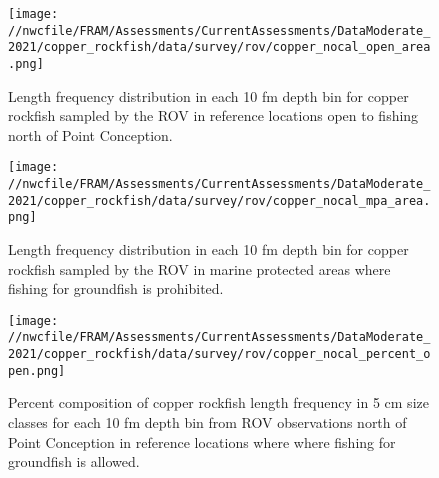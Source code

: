 \documentclass[11pt,
  english,
  a4paper,
]{article}
\begin{document}

\begin{figure}
\centering
\texttt{[image: //nwcfile/FRAM/Assessments/CurrentAssessments/DataModerate\_2021/copper\_rockfish/data/survey/rov/copper\_nocal\_open\_area.png]}
\caption{Length frequency distribution in each 10 fm depth bin for copper rockfish sampled by the ROV in reference locations open to fishing north of Point Conception.\label{fig:rov-open}}
\end{figure}

\tagmcend\tagstructend

\clearpage


\begin{figure}
\centering
\texttt{[image: //nwcfile/FRAM/Assessments/CurrentAssessments/DataModerate\_2021/copper\_rockfish/data/survey/rov/copper\_nocal\_mpa\_area.png]}
\caption{Length frequency distribution in each 10 fm depth bin for copper rockfish sampled by the ROV in marine protected areas where fishing for groundfish is prohibited.\label{fig:rov-mpa}}
\end{figure}

\tagmcend\tagstructend

\clearpage


\begin{figure}
\centering
\texttt{[image: //nwcfile/FRAM/Assessments/CurrentAssessments/DataModerate\_2021/copper\_rockfish/data/survey/rov/copper\_nocal\_percent\_open.png]}
\caption{Percent composition of copper rockfish length frequency in 5 cm size classes for each 10 fm depth bin from ROV observations north of Point Conception in reference locations where where fishing for groundfish is allowed.\label{fig:rov-percent-open}}
\end{figure}
\end{document}

